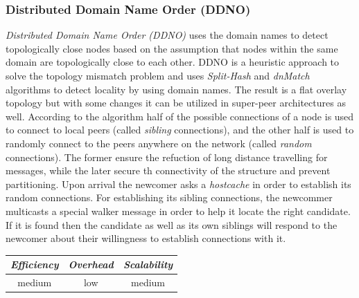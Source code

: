 \subsubsection{Distributed Domain Name Order (DDNO)}
\emph{Distributed Domain Name Order (DDNO)} \cite{Z-YK2005} uses the domain
names to detect topologically close nodes based on the assumption that nodes
within the same domain are topologically close to each other. DDNO is a
heuristic approach to solve the topology mismatch problem and uses
\emph{Split-Hash} and \emph{dnMatch} algorithms to detect locality by using
domain names. The result is a flat overlay topology but with some changes it
can be utilized in super-peer architectures as well. According to the algorithm
half of the possible connections of a node is used to connect to local peers
(called \emph{sibling} connections), and the other half is used to randomly
connect to the peers anywhere on the network (called \emph{random} connections).
The former ensure the refuction of long distance travelling for messages, while
the later secure th connectivity of the structure and prevent partitioning. Upon
arrival the newcomer asks a \emph{hostcache} in order to establish its random
connections. For establishing its sibling connections, the newcommer multicasts
a special walker message in order to help it locate the right candidate. If it
is found then the candidate as well as its own siblings will respond to the
newcomer about their willingness to establish connections with it.

\begin{center}
\begin{tabular}{ccc}
\emph{Efficiency} & \emph{Overhead} & \emph{Scalability} \\
\hline
medium &
low &
medium
\end{tabular}
\end{center}

